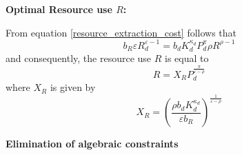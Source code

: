 \textbf{Optimal Resource use $R$:}

From equation \eqref{resource_extraction_cost} follows that
\begin{equation}
	b_R \varepsilon R_d^{\varepsilon-1} = b_d K_d^{\kappa_d}P_d^{\pi}\rho R^{\rho-1}
	\label{optimal_resource_extraction_condition}
\end{equation}
and consequently, the resource use $R$ is equal to
\begin{equation}
	R = X_R P_d^{\frac{\pi}{\varepsilon-\rho}}
	\label{optimal_resource_extraction}
\end{equation}
where $X_R$ is given by
\begin{equation}
	X_R = \left( \frac{\rho b_d K_d^{\kappa_d}}{ \varepsilon b_R} \right)^{\frac{1}{\varepsilon-\rho}}
	\label{optimal_resource_XR}
\end{equation}


\textbf{Elimination of algebraic constraints}

